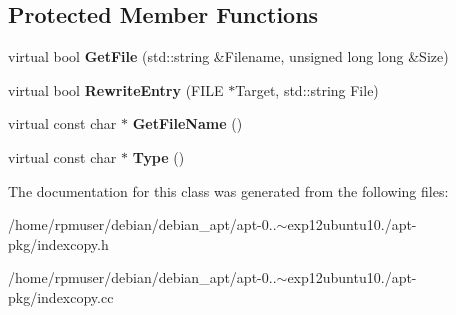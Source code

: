 \subsection*{\-Protected \-Member \-Functions}
\begin{DoxyCompactItemize}
\item 
virtual bool {\bfseries \-Get\-File} (std\-::string \&\-Filename, unsigned long long \&\-Size)\label{classSourceCopy_a6e537ba3dcb7ca8854dee7e9bead5c5e}

\item 
virtual bool {\bfseries \-Rewrite\-Entry} (\-F\-I\-L\-E $\ast$\-Target, std\-::string \-File)\label{classSourceCopy_a56581cf4bf4b32530c6fdeacb6051a65}

\item 
virtual const char $\ast$ {\bfseries \-Get\-File\-Name} ()\label{classSourceCopy_a30310e33e458ab5a340cca45aa4211cd}

\item 
virtual const char $\ast$ {\bfseries \-Type} ()\label{classSourceCopy_a6472491bac6385804dd5e43a29ef7714}

\end{DoxyCompactItemize}


\-The documentation for this class was generated from the following files\-:\begin{DoxyCompactItemize}
\item 
/home/rpmuser/debian/debian\-\_\-apt/apt-\/0..$\sim$exp12ubuntu10./apt-\/pkg/indexcopy.\-h\item 
/home/rpmuser/debian/debian\-\_\-apt/apt-\/0..$\sim$exp12ubuntu10./apt-\/pkg/indexcopy.\-cc\end{DoxyCompactItemize}
